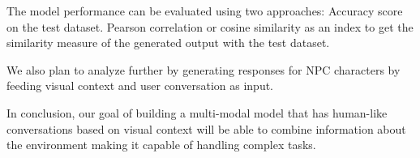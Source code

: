 \documentclass{article}
\begin{document}
The model performance can be evaluated using two approaches:
Accuracy score on the test dataset.
Pearson correlation or cosine similarity as an index to get the similarity measure of the generated output with the test dataset.

We also plan to analyze further by generating responses for NPC characters by feeding visual context and user conversation as input.

In conclusion, our goal of building a multi-modal model that has human-like conversations based on visual context will be able to combine information about the environment making it capable of handling complex tasks.

\newpage




\end{document}
